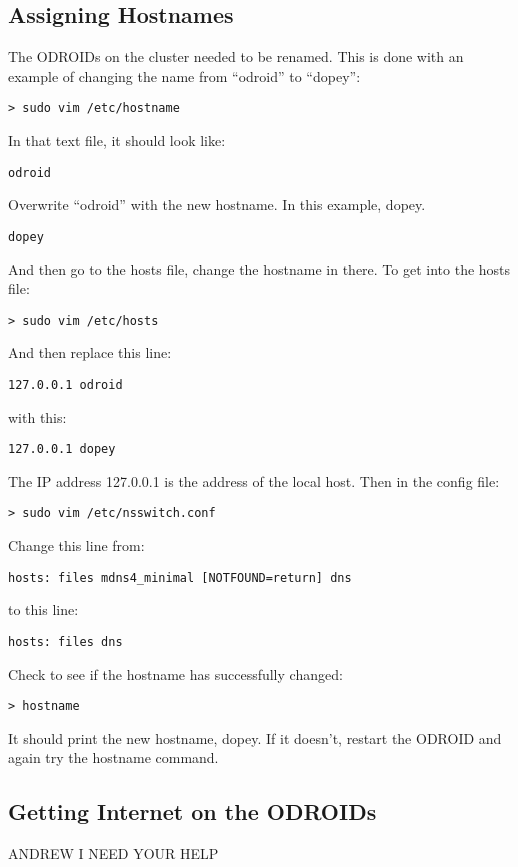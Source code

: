 \subsection{Assigning Hostnames}
The ODROIDs on the cluster needed to be renamed. This is done with an example of changing the name from ``odroid'' to ``dopey'':
\begin{lstlisting}
> sudo vim /etc/hostname
\end{lstlisting}
In that text file, it should look like:
\begin{lstlisting}
odroid
\end{lstlisting}
Overwrite ``odroid'' with the new hostname. In this example, dopey.
\begin{lstlisting}
dopey
\end{lstlisting}
And then go to the hosts file, change the hostname in there. To get into the hosts file:
\begin{lstlisting}
> sudo vim /etc/hosts
\end{lstlisting}
And then replace this line:
\begin{lstlisting}
127.0.0.1 odroid
\end{lstlisting} 
with this:
\begin{lstlisting}
127.0.0.1 dopey
\end{lstlisting}
The IP address 127.0.0.1 is the address of the local host. Then in the config file:
\begin{lstlisting}
> sudo vim /etc/nsswitch.conf
\end{lstlisting}
Change this line from:
\begin{lstlisting}
hosts: files mdns4_minimal [NOTFOUND=return] dns
\end{lstlisting}
to this line:
\begin{lstlisting}
hosts: files dns
\end{lstlisting}
Check to see if the hostname has successfully changed:
\begin{lstlisting}
> hostname
\end{lstlisting}
It should print the new hostname, dopey. If it doesn't, restart the ODROID and again try the hostname command.

\subsection{Getting Internet on the ODROIDs}
ANDREW I NEED YOUR HELP

